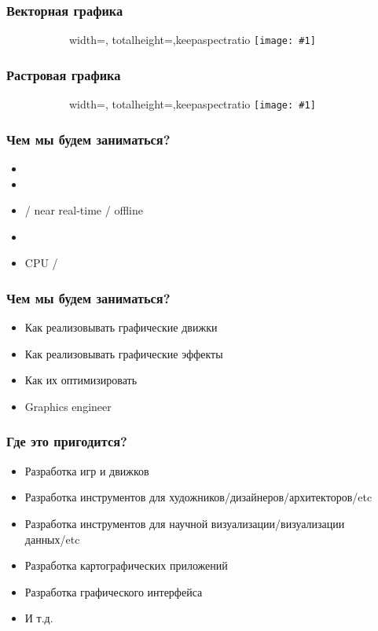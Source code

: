 \documentclass{beamer}
\newcommand{\slideimage}[1]{
  \begin{figure}
    \begin{adjustbox}{width=\textwidth, totalheight=\textheight-2\baselineskip-2\baselineskip,keepaspectratio}
      \texttt{[image: \#1]}
    \end{adjustbox}
  \end{figure}
}
\begin{document}

\begin{frame}
\frametitle{Векторная графика}
\begin{figure}
\slideimage{vector.jpg}
\end{figure}
\end{frame}

\begin{frame}
\frametitle{Растровая графика}
\begin{figure}
\slideimage{raster.png}
\end{figure}
\end{frame}


\begin{frame}
\frametitle{Чем мы будем заниматься?}
\begin{itemize}
\item {}
\item {}
\item {} / near real-time / offline
\item {}
\item CPU / 
\end{itemize}
\end{frame}

\begin{frame}
\frametitle{Чем мы будем заниматься?}
\begin{itemize}
\pause
\item Как реализовывать графические движки
\pause
\item Как реализовывать графические эффекты
\pause
\item Как их оптимизировать
\pause
\item Graphics engineer
\end{itemize}
\end{frame}

\begin{frame}
\frametitle{Где это пригодится?}
\begin{itemize}
\pause
\item Разработка игр и движков
\pause
\item Разработка инструментов для художников/дизайнеров/архитекторов/etc
\pause
\item Разработка инструментов для научной визуализации/визуализации данных/etc
\pause
\item Разработка картографических приложений
\pause
\item Разработка графического интерфейса
\pause
\item И т.д.
\end{itemize}
\end{frame}
\end{document}

